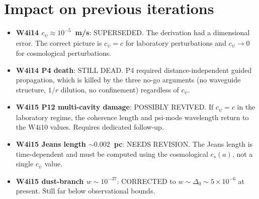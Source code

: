 \documentclass[11pt]{article}
\newcommand{\ee}[1]{\times 10^{#1}}
\begin{document}
\section{Impact on previous iterations}

\begin{itemize}[nosep]
\item \textbf{W4i14 $c_\psi \approx 10^{-5}$~m/s}: SUPERSEDED.
  The derivation had a dimensional error. The correct picture is
  $c_\psi = c$ for laboratory perturbations and $c_\psi \to 0$ for
  cosmological perturbations.
\item \textbf{W4i14 P4 death}: STILL DEAD. P4 required distance-independent
  guided propagation, which is killed by the three no-go arguments
  (no waveguide structure, $1/r$ dilution, no confinement) regardless
  of $c_\psi$.
\item \textbf{W4i15 P12 multi-cavity damage}: POSSIBLY REVIVED.
  If $c_\psi = c$ in the laboratory regime, the coherence length and
  psi-mode wavelength return to the W4i10 values. Requires dedicated
  follow-up.
\item \textbf{W4i15 Jeans length $\sim 0.002$~pc}: NEEDS REVISION.
  The Jeans length is time-dependent and must be computed using the
  cosmological $c_s(a)$, not a single $c_\psi$ value.
\item \textbf{W4i15 dust-branch $w \sim 10^{-37}$}: CORRECTED to
  $w \sim \Delta_0 \sim 5\ee{-6}$ at present. Still far below
  observational bounds.
\end{itemize}
\end{document}

